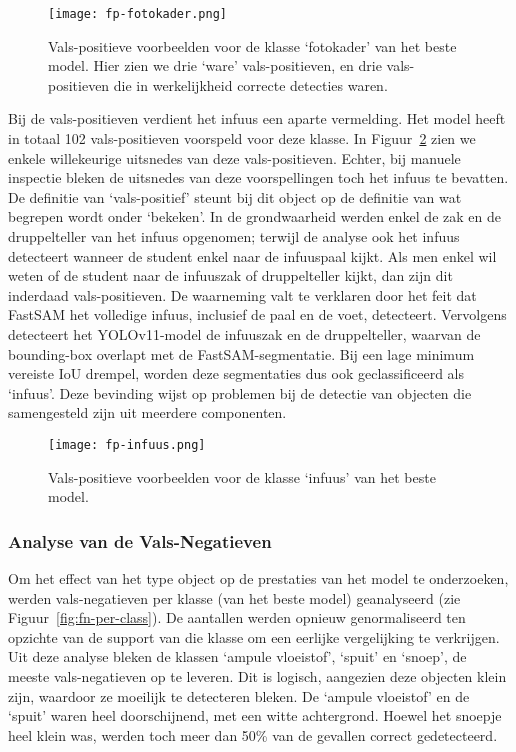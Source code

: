 \begin{figure}[H]
  \centering
  \texttt{[image: fp-fotokader.png]}
  \caption[]{\label{fig:fp-examples-fotokader}
    Vals-positieve voorbeelden voor de klasse `fotokader' van het beste model.
    Hier zien we drie `ware' vals-positieven, en drie vals-positieven die in werkelijkheid correcte detecties waren. 
    }
\end{figure}

Bij de vals-positieven verdient het infuus een aparte vermelding.
Het model heeft in totaal 102 vals-positieven voorspeld voor deze klasse.
In Figuur~\ref{fig:fp-infuus} zien we enkele willekeurige uitsnedes van deze vals-positieven.
Echter, bij manuele inspectie bleken de uitsnedes van deze voorspellingen toch het infuus te bevatten.
De definitie van `vals-positief' steunt bij dit object op de definitie van wat begrepen wordt onder `bekeken'.
In de grondwaarheid werden enkel de zak en de druppelteller van het infuus opgenomen;
terwijl de analyse ook het infuus detecteert wanneer de student enkel naar de infuuspaal kijkt.
Als men enkel wil weten of de student naar de infuuszak of druppelteller kijkt, dan zijn dit inderdaad vals-positieven.
De waarneming valt te verklaren door het feit dat FastSAM het volledige infuus, inclusief de paal en de voet, detecteert.
Vervolgens detecteert het YOLOv11-model de infuuszak en de druppelteller, waarvan de bounding-box overlapt met de FastSAM-segmentatie.
Bij een lage minimum vereiste IoU drempel, worden deze segmentaties dus ook geclassificeerd als `infuus'.
Deze bevinding wijst op problemen bij de detectie van objecten die samengesteld zijn uit meerdere componenten.

\begin{figure}[H]
  \centering
  \texttt{[image: fp-infuus.png]}
  \caption[]{\label{fig:fp-infuus}
    Vals-positieve voorbeelden voor de klasse `infuus' van het beste model.
    }
\end{figure}

\subsubsection{Analyse van de Vals-Negatieven}

Om het effect van het type object op de prestaties van het model te onderzoeken,
werden vals-negatieven per klasse (van het beste model) geanalyseerd (zie Figuur~\ref{fig:fn-per-class}).
De aantallen werden opnieuw genormaliseerd ten opzichte van de support van die klasse om een eerlijke vergelijking te verkrijgen.
Uit deze analyse bleken de klassen `ampule vloeistof', `spuit' en `snoep', de meeste vals-negatieven op te leveren.
Dit is logisch, aangezien deze objecten klein zijn, waardoor ze moeilijk te detecteren bleken.
De `ampule vloeistof' en de `spuit' waren heel doorschijnend, met een witte achtergrond.
Hoewel het snoepje heel klein was, werden toch meer dan 50\% van de gevallen correct gedetecteerd. 

